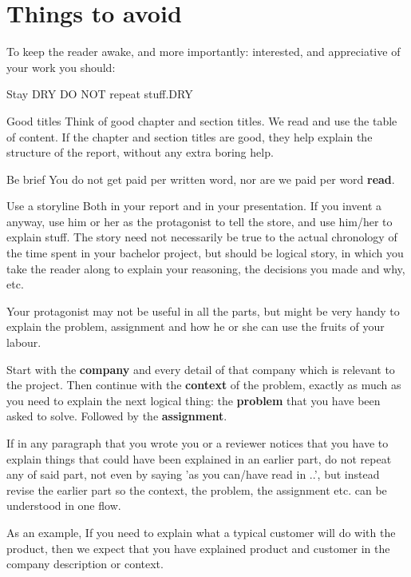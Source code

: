 \section{Things to avoid}
To keep the reader awake, and more importantly: interested, and appreciative of your work you should:
\begin{Description}
\item[Stay DRY] DO NOT repeat stuff.\gls{DRY}
\item[Good titles] Think of good chapter and section titles. We read
  and use the table of content. If the chapter and section titles are
  good, they help explain the structure of the report, without any
  extra boring help.
\item[Be brief] You do not get paid per written word, nor are we paid per word \textbf{read}.
\item[Use a storyline] Both in your report and in your
  presentation. If you invent a  anyway, use him or her as the
  protagonist to tell the store, and use him/her to explain stuff. 
The story need not necessarily be true to the actual chronology of the
time spent in your bachelor project, but should be logical story, in
which you take the reader along to explain your reasoning, the
decisions you made and why, etc. 
\end{Description}

Your protagonist may not be useful in all the parts, but might be very
handy to explain the problem, assignment and how he or she can use the
fruits of your labour.

Start with the \textbf{company} and every detail of that company which is relevant to the project.
Then continue with the \textbf{context} of the problem, exactly as
much as you need to explain the next logical thing: the
\textbf{problem} that you have been asked to solve. Followed by the
\textbf{assignment}.

If in any paragraph that you wrote you or a reviewer notices that you have to explain things
that could have been explained in an earlier part, do not repeat any of said part,
not even by saying 'as you can/have read in ..', but instead revise the earlier part so the context, the problem, the assignment etc. can be understood in one flow.

As an example, If you need to explain what a typical customer will do with the product, then we expect that you have explained product and customer in the company description or context.

